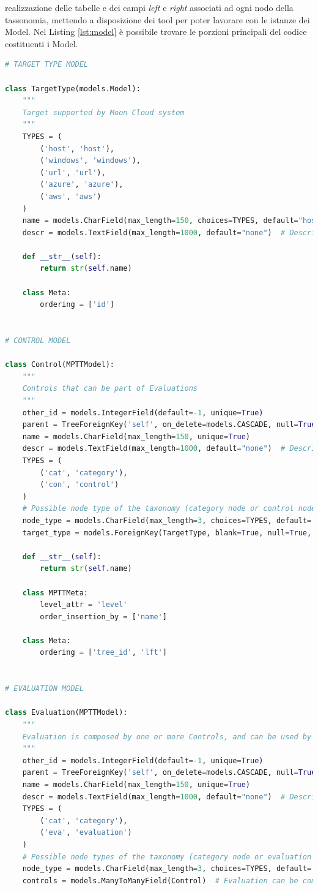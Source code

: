 realizzazione delle tabelle e dei campi \textit{left} e \textit{right} associati ad ogni nodo della tassonomia, mettendo a disposizione dei 
tool per poter lavorare con le istanze dei Model. Nel Listing \ref{lst:model} è possibile trovare le porzioni principali del 
codice costituenti i Model.
%
\lstset{style=python_code_style}
\begin{lstlisting}[language=Python, label=lst:model, caption={Parti principali del codice che costituiscono i Model della soluzione.}]
# TARGET TYPE MODEL
 
class TargetType(models.Model):
    """
    Target supported by Moon Cloud system
    """
    TYPES = (
        ('host', 'host'),
        ('windows', 'windows'),
        ('url', 'url'),
        ('azure', 'azure'),
        ('aws', 'aws')
    )
    name = models.CharField(max_length=150, choices=TYPES, default="host")
    descr = models.TextField(max_length=1000, default="none")  # Description of a target
 
    def __str__(self):
        return str(self.name)
 
    class Meta:
        ordering = ['id']
 
 
# CONTROL MODEL
 
class Control(MPTTModel):
    """
    Controls that can be part of Evaluations
    """
    other_id = models.IntegerField(default=-1, unique=True)
    parent = TreeForeignKey('self', on_delete=models.CASCADE, null=True, blank=True, related_name='children')
    name = models.CharField(max_length=150, unique=True)
    descr = models.TextField(max_length=1000, default="none")  # Description of a node in the taxonomy
    TYPES = (
        ('cat', 'category'),
        ('con', 'control')
    )
    # Possible node type of the taxonomy (category node or control node)
    node_type = models.CharField(max_length=3, choices=TYPES, default='cat')
    target_type = models.ForeignKey(TargetType, blank=True, null=True, on_delete=models.CASCADE)  # It's null for the root node and category nodes
 
    def __str__(self):
        return str(self.name)
 
    class MPTTMeta:
        level_attr = 'level'
        order_insertion_by = ['name']
 
    class Meta:
        ordering = ['tree_id', 'lft']
 
 
# EVALUATION MODEL
 
class Evaluation(MPTTModel):
    """
    Evaluation is composed by one or more Controls, and can be used by Users
    """
    other_id = models.IntegerField(default=-1, unique=True)
    parent = TreeForeignKey('self', on_delete=models.CASCADE, null=True, blank=True, related_name='children')
    name = models.CharField(max_length=150, unique=True)
    descr = models.TextField(max_length=1000, default="none")  # Description of a node in the taxonomy
    TYPES = (
        ('cat', 'category'),
        ('eva', 'evaluation')
    )
    # Possible node types of the taxonomy (category node or evaluation node)
    node_type = models.CharField(max_length=3, choices=TYPES, default='cat')
    controls = models.ManyToManyField(Control)  # Evaluation can be composed of one or more controls
 

\end{lstlisting}
